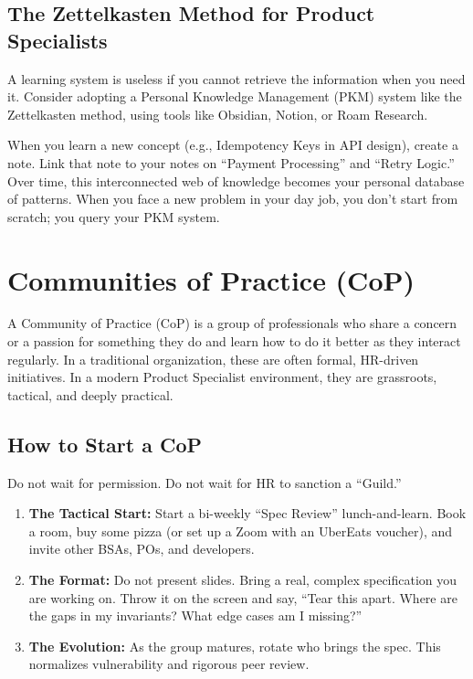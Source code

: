\subsection{The Zettelkasten Method for Product
Specialists}\label{the-zettelkasten-method-for-product-specialists}

A learning system is useless if you cannot retrieve the information when
you need it. Consider adopting a Personal Knowledge Management (PKM)
system like the Zettelkasten method, using tools like Obsidian, Notion,
or Roam Research.

When you learn a new concept (e.g., Idempotency Keys in API design),
create a note. Link that note to your notes on ``Payment Processing''
and ``Retry Logic.'' Over time, this interconnected web of knowledge
becomes your personal database of patterns. When you face a new problem
in your day job, you don't start from scratch; you query your PKM
system.

\bigskip

\section{Communities of Practice
(CoP)}\label{communities-of-practice-cop}

A Community of Practice (CoP) is a group of professionals who share a
concern or a passion for something they do and learn how to do it better
as they interact regularly. In a traditional organization, these are
often formal, HR-driven initiatives. In a modern Product Specialist
environment, they are grassroots, tactical, and deeply practical.

\subsection{How to Start a CoP}\label{how-to-start-a-cop}

Do not wait for permission. Do not wait for HR to sanction a ``Guild.''

\begin{enumerate}
\def\labelenumi{\arabic{enumi}.}
\tightlist
\item
  \textbf{The Tactical Start:} Start a bi-weekly ``Spec Review''
  lunch-and-learn. Book a room, buy some pizza (or set up a Zoom with an
  UberEats voucher), and invite other BSAs, POs, and developers.
\item
  \textbf{The Format:} Do not present slides. Bring a real, complex
  specification you are working on. Throw it on the screen and say,
  ``Tear this apart. Where are the gaps in my invariants? What edge
  cases am I missing?''
\item
  \textbf{The Evolution:} As the group matures, rotate who brings the
  spec. This normalizes vulnerability and rigorous peer review.
\end{enumerate}

